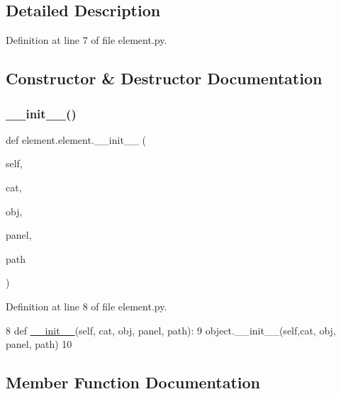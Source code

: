 \subsection{Detailed Description}


Definition at line 7 of file element.\+py.



\subsection{Constructor \& Destructor Documentation}
\mbox{\label{classelement_1_1element_a72de0f0e7b950dabca314ed77552cb90}} 
\subsubsection{\texorpdfstring{\+\_\+\+\_\+init\+\_\+\+\_\+()}{\_\_init\_\_()}}
{\footnotesize\ttfamily def element.\+element.\+\_\+\+\_\+init\+\_\+\+\_\+ (\begin{DoxyParamCaption}\item[{}]{self,  }\item[{}]{cat,  }\item[{}]{obj,  }\item[{}]{panel,  }\item[{}]{path }\end{DoxyParamCaption})}



Definition at line 8 of file element.\+py.


\begin{DoxyCode}
8     \textcolor{keyword}{def }\hyperlink{classwrapper_1_1ModuleDictWrapper_a9a7a794150502f51df687831583e13b9}{\_\_init\_\_}(self, cat, obj, panel, path):
9         object.\_\_init\_\_(self,cat, obj, panel, path)
10 
\end{DoxyCode}


\subsection{Member Function Documentation}
\mbox{\label{classelement_1_1element_aa9fadd76b299e1dfddd1da112dfe8245}} 
